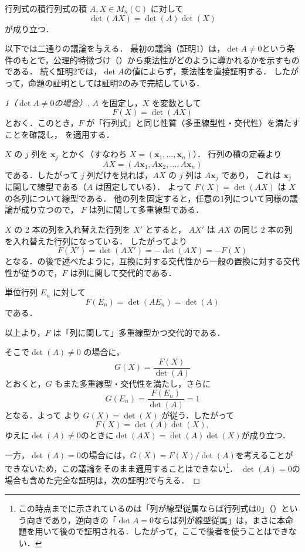 \begin{prop}{行列式の積}{行列式の積}
  $A, X \in M_n(\mathbb{C})$ に対して
  \[
    \det(AX)=\det(A)\det(X)
  \]
  が成り立つ．
\end{prop}

以下では二通りの議論を与える．
最初の議論（証明1）は，$\det A \ne 0$という条件のもとで，公理的特徴づけ（）から乗法性がどのように導かれるかを示すものである．
続く証明2では，$\det A$の値によらず，乗法性を直接証明する．
したがって，命題の証明としては証明2のみで完結している．

\begin{tleftbar}
\begin{proof}[1（$\det A \ne 0$の場合）]
  $A$ を固定し，$X$ を変数として
  \[
    F(X)=  \det(AX)
  \]
  とおく．このとき，$F$ が「行列式」と同じ性質（多重線型性・交代性）を満たすことを確認し，
  を適用する．


  $X$ の $j$ 列を $\bm{x}_j$ とかく（すなわち $X=(\bm{x}_1,\dots,\bm{x}_n)$）．
  行列の積の定義より
  \[
    AX=(A\bm{x}_1,A\bm{x}_2,\dots,A\bm{x}_n)
  \]
  である．したがって $j$ 列だけを見れば，$AX$ の $j$ 列は $A\bm{x}_j$ であり，
  これは $\bm{x}_j$ に関して線型である（$A$ は固定している）．
  よって $F(X)=\det(AX)$ は $X$ の各列について線型である．
他の列を固定すると，任意の1列について同様の議論が成り立つので，
$F$ は列に関して多重線型である．

  $X$ の 2 本の列を入れ替えた行列を $X'$ とすると，
  $AX'$ は $AX$ の同じ 2 本の列を入れ替えた行列になっている．
  したがってより
  \[
    F(X')=\det(AX')=-\det(AX)=-F(X)
  \]
  となる．の後で述べたように，互換に対する交代性から一般の置換に対する交代性が従うので，$F$ は列に関して交代的である．

  単位行列 $E_n$ に対して
  \[
    F(E_n)=\det(AE_n)=\det(A)
  \]
  である．

  以上より，$F$ は「列に関して」多重線型かつ交代的である．

  \smallskip
  そこで$\det(A) \ne 0$ の場合に，
  \[
    G(X) = \frac{F(X)}{\det(A)}
  \]
  とおくと，$G$ もまた多重線型・交代性を満たし，さらに
  \[
    G(E_n)=\frac{F(E_n)}{\det(A)}=1
  \]
  となる．よって より $G(X)=\det(X)$ が従う．したがって
  \[
    F(X)=\det(A)\det(X),
  \]
  ゆえに$\det (A) \ne 0$のときに$\det(AX)=\det(A)\det(X)$が成り立つ．

  \smallskip
  一方，$\det(A)=0$の場合には，$G(X)=F(X)/\det(A)$を考えることができないため，この議論をそのまま適用することはできない\footnote{この時点までに示されているのは「列が線型従属ならば行列式は$0$」（）という向きであり，逆向きの「$\det A = 0$ならば列が線型従属」は，まさに本命題を用いて後ので証明される．したがって，ここで後者を使うことはできない．}．
  $\det(A)=0$の場合も含めた完全な証明は，次の証明2で与える．
\end{proof}
\end{tleftbar}


